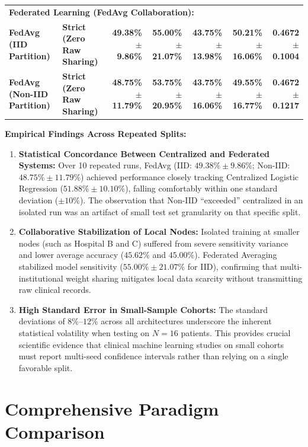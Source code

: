 \begin{table}[htbp]
{\begin{tabular}{@{}llrrrrr@{}}
\multicolumn{7}{l}{\textbf{Federated Learning (FedAvg Collaboration):}} \\
\textbf{FedAvg (IID Partition)} & \textbf{Strict (Zero Raw Sharing)} & \textbf{49.38\% $\pm$ 9.86\%} & \textbf{55.00\% $\pm$ 21.07\%} & \textbf{43.75\% $\pm$ 13.98\%} & \textbf{50.21\% $\pm$ 16.06\%} & \textbf{0.4672 $\pm$ 0.1004} \\
\textbf{FedAvg (Non-IID Partition)} & \textbf{Strict (Zero Raw Sharing)} & \textbf{48.75\% $\pm$ 11.79\%} & \textbf{53.75\% $\pm$ 20.95\%} & \textbf{43.75\% $\pm$ 16.06\%} & \textbf{49.55\% $\pm$ 16.77\%} & \textbf{0.4672 $\pm$ 0.1217} \\ \bottomrule
\end{tabular}%
}
\end{table}

\noindent \textbf{Empirical Findings Across Repeated Splits:}
\begin{enumerate}
    \item \textbf{Statistical Concordance Between Centralized and Federated Systems:} Over 10 repeated runs, FedAvg (IID: $49.38\% \pm 9.86\%$; Non-IID: $48.75\% \pm 11.79\%$) achieved performance closely tracking Centralized Logistic Regression ($51.88\% \pm 10.10\%$), falling comfortably within one standard deviation ($\pm 10\%$). The observation that Non-IID ``exceeded'' centralized in an isolated run was an artifact of small test set granularity on that specific split.
    \item \textbf{Collaborative Stabilization of Local Nodes:} Isolated training at smaller nodes (such as Hospital B and C) suffered from severe sensitivity variance and lower average accuracy ($45.62\%$ and $45.00\%$). Federated Averaging stabilized model sensitivity ($55.00\% \pm 21.07\%$ for IID), confirming that multi-institutional weight sharing mitigates local data scarcity without transmitting raw clinical records.
    \item \textbf{High Standard Error in Small-Sample Cohorts:} The standard deviations of $8\%$--$12\%$ across all architectures underscore the inherent statistical volatility when testing on $N=16$ patients. This provides crucial scientific evidence that clinical machine learning studies on small cohorts must report multi-seed confidence intervals rather than relying on a single favorable split.
\end{enumerate}

\section{Comprehensive Paradigm Comparison}
\label{sec:paradigm_comparison}

